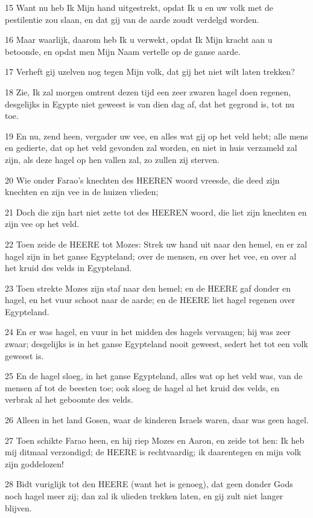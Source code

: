 \par 15 Want nu heb Ik Mijn hand uitgestrekt, opdat Ik u en uw volk met de pestilentie zou slaan, en dat gij van de aarde zoudt verdelgd worden.
\par 16 Maar waarlijk, daarom heb Ik u verwekt, opdat Ik Mijn kracht aan u betoonde, en opdat men Mijn Naam vertelle op de ganse aarde.
\par 17 Verheft gij uzelven nog tegen Mijn volk, dat gij het niet wilt laten trekken?
\par 18 Zie, Ik zal morgen omtrent dezen tijd een zeer zwaren hagel doen regenen, desgelijks in Egypte niet geweest is van dien dag af, dat het gegrond is, tot nu toe.
\par 19 En nu, zend heen, vergader uw vee, en alles wat gij op het veld hebt; alle mens en gedierte, dat op het veld gevonden zal worden, en niet in huis verzameld zal zijn, als deze hagel op hen vallen zal, zo zullen zij sterven.
\par 20 Wie onder Farao's knechten des HEEREN woord vreesde, die deed zijn knechten en zijn vee in de huizen vlieden;
\par 21 Doch die zijn hart niet zette tot des HEEREN woord, die liet zijn knechten en zijn vee op het veld.
\par 22 Toen zeide de HEERE tot Mozes: Strek uw hand uit naar den hemel, en er zal hagel zijn in het ganse Egypteland; over de mensen, en over het vee, en over al het kruid des velds in Egypteland.
\par 23 Toen strekte Mozes zijn staf naar den hemel; en de HEERE gaf donder en hagel, en het vuur schoot naar de aarde; en de HEERE liet hagel regenen over Egypteland.
\par 24 En er was hagel, en vuur in het midden des hagels vervangen; hij was zeer zwaar; desgelijks is in het ganse Egypteland nooit geweest, sedert het tot een volk geweest is.
\par 25 En de hagel sloeg, in het ganse Egypteland, alles wat op het veld was, van de mensen af tot de beesten toe; ook sloeg de hagel al het kruid des velds, en verbrak al het geboomte des velds.
\par 26 Alleen in het land Gosen, waar de kinderen Israels waren, daar was geen hagel.
\par 27 Toen schikte Farao heen, en hij riep Mozes en Aaron, en zeide tot hen: Ik heb mij ditmaal verzondigd; de HEERE is rechtvaardig; ik daarentegen en mijn volk zijn goddelozen!
\par 28 Bidt vuriglijk tot den HEERE (want het is genoeg), dat geen donder Gods noch hagel meer zij; dan zal ik ulieden trekken laten, en gij zult niet langer blijven.
